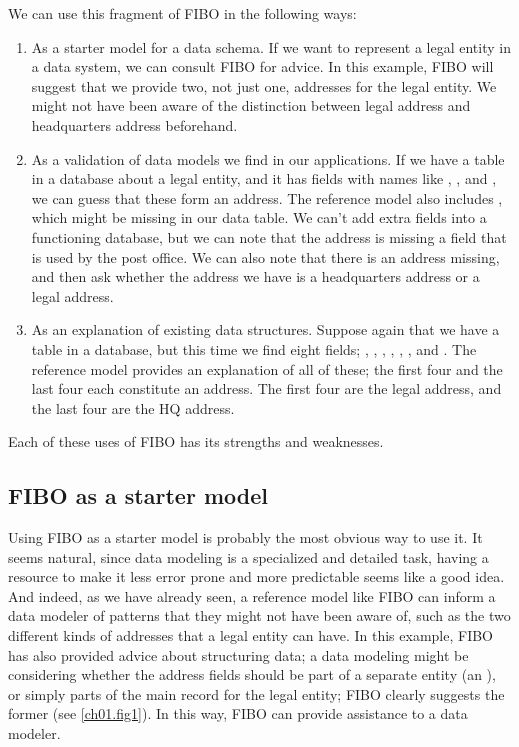 We can use this fragment of FIBO in the following ways: 

\begin{enumerate}
    \item As a starter model for a data schema.  If we want to represent a legal entity in a data system, we can consult FIBO for advice.  In this example, FIBO will suggest that we provide two, not just one, addresses for the legal entity.  We might not have been aware of the distinction between legal address and headquarters address beforehand. 
    \item As a validation of data models we find in our applications.  If we have a table in a database about a legal entity, and it has fields with names like , , and , we can guess that these form an address.  The reference model also includes , which might be missing in our data table.  We can't add extra fields into a functioning database, but we can note that the address is missing a field that is used by the post office.  We can also note that there is an address missing, and then ask whether the address we have is a headquarters address or a legal address. 
    \item As an explanation of existing data structures. Suppose again that we have a table in a database, but this time we find eight fields; , , , , , ,  and .  The reference model provides an explanation of all of these; the first four and the last four each constitute an address.  The first four are the legal address, and the last four are the HQ address. 
\end{enumerate}

Each of these uses of FIBO has its strengths and weaknesses. 

\subsection{FIBO as a starter model}
Using FIBO as a starter model is probably the most obvious way to use it.  It seems natural, since data modeling is a specialized and detailed task, having a resource to make it less error prone and more predictable seems like a good idea.  And indeed, as we have already seen, a reference model like FIBO can inform a data modeler of patterns that they might not have been aware of, such as the two different kinds of addresses that a legal entity can have.  In this example, FIBO has also provided advice about structuring data; a data modeling might be considering whether the address fields should be part of a separate entity (an ), or simply parts of the main record for the legal entity; FIBO clearly suggests the former (see \ref{ch01.fig1}).   In this way, FIBO can provide assistance to a data modeler.

